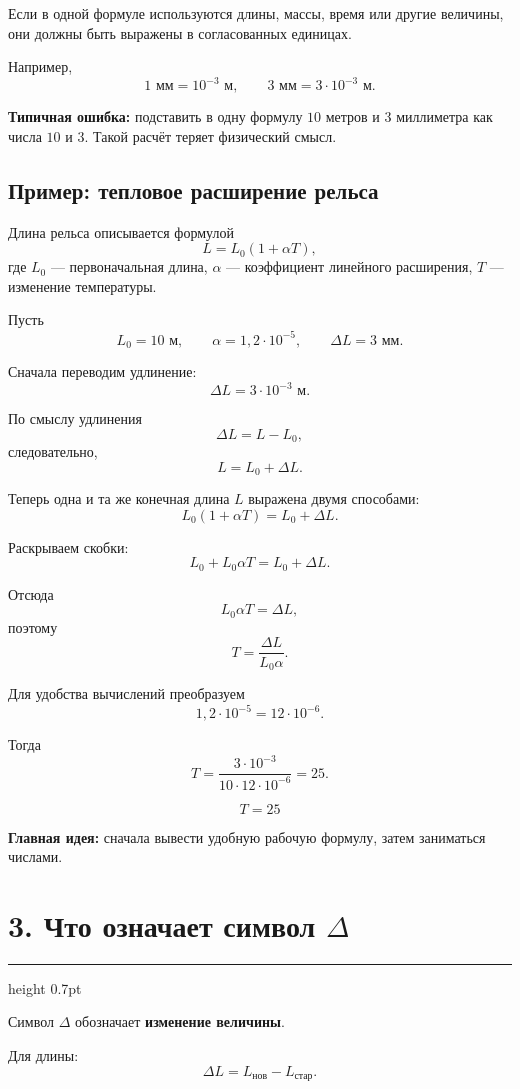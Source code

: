 \documentclass[a4paper,12pt]{article}
\newcommand{\sectionline}{%
    \par\vspace{0.15em}
    {\color{lightaccent}\hrule height 0.7pt}
    \vspace{0.7em}
}
\newcommand{\key}[1]{\textcolor{darkaccent}{\textbf{#1}}}
\begin{document}
Если в одной формуле используются длины, массы, время или другие величины,
они должны быть выражены в согласованных единицах.

Например,
\[
1\text{ мм}=10^{-3}\text{ м},
\qquad
3\text{ мм}=3\cdot10^{-3}\text{ м}.
\]

\key{Типичная ошибка:} подставить в одну формулу \(10\) метров и \(3\)
миллиметра как числа \(10\) и \(3\). Такой расчёт теряет физический смысл.

\subsection*{\textcolor{accent}{Пример: тепловое расширение рельса}}

Длина рельса описывается формулой
\[
L=L_0(1+\alpha T),
\]
где \(L_0\) --- первоначальная длина, \(\alpha\) --- коэффициент линейного
расширения, \(T\) --- изменение температуры.

Пусть
\[
L_0=10\text{ м},
\qquad
\alpha=1,2\cdot10^{-5},
\qquad
\Delta L=3\text{ мм}.
\]

Сначала переводим удлинение:
\[
\Delta L=3\cdot10^{-3}\text{ м}.
\]

По смыслу удлинения
\[
\Delta L=L-L_0,
\]
следовательно,
\[
L=L_0+\Delta L.
\]

Теперь одна и та же конечная длина \(L\) выражена двумя способами:
\[
L_0(1+\alpha T)=L_0+\Delta L.
\]

Раскрываем скобки:
\[
L_0+L_0\alpha T=L_0+\Delta L.
\]

Отсюда
\[
L_0\alpha T=\Delta L,
\]
поэтому
\[
\boxed{T=\frac{\Delta L}{L_0\alpha}}.
\]

Для удобства вычислений преобразуем
\[
1,2\cdot10^{-5}=12\cdot10^{-6}.
\]

Тогда
\[
T=
\frac{3\cdot10^{-3}}
{10\cdot12\cdot10^{-6}}
=25.
\]

\[
\boxed{T=25}
\]

\key{Главная идея:} сначала вывести удобную рабочую формулу, затем заниматься
числами.

\section*{\textcolor{darkaccent}{3. Что означает символ \(\Delta\)}}

\sectionline

Символ \(\Delta\) обозначает \textbf{изменение величины}.

Для длины:
\[
\boxed{\Delta L=L_{\text{нов}}-L_{\text{стар}}}.
\]
\end{document}
